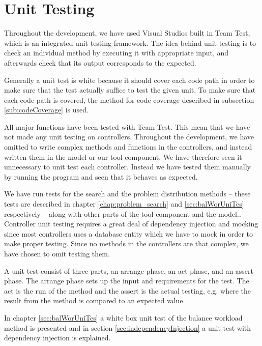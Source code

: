 \section{Unit Testing}
\label{chap:testing}
Throughout the development, we have used Visual Studios built in Team Test, which is an integrated unit-testing framework. \cite{teamtest} 
The idea behind unit testing is to check an individual method by executing it with appropriate input, and afterwards check that its output corresponds to the expected.

Generally a unit test is white because it should cover each code path in order to make sure that the test actually suffice to test the given unit. \cite[p.~39]{williams06}
To make sure that each code path is covered, the method for code coverage described in subsection \ref{sub:codeCoverage} is used.

All major functions have been tested with Team Test. This mean that we have not made any unit testing on controllers. 
Throughout the development, we have omitted to write complex methods and functions in the controllers, and instead written them in the model or our tool component. We have therefore seen it unnecessary to unit test each controller. Instead we have tested them manually by running the program and seen that it behaves as expected. 

We have run tests for the search and the problem distribution methods -- these tests are described in chapter \ref{chap:problem_search} and \ref{sec:balWorUniTes} respectively -- along with other parts of the tool component and the model.. 
Controller unit testing requires a great deal of dependency injection and mocking since most controllers uses a database entity which we have to mock in order to make proper testing.
Since no methods in the controllers are that complex, we have chosen to omit testing them.

A unit test consist of three parts, an arrange phase, an act phase, and an assert phase. 
The arrange phase sets up the input and requirements for the test. 
The act is the run of the method and the assert is the actual testing, e.g. where the result from the method is compared to an expected value.

In chapter \ref{sec:balWorUniTes} a white box unit test of the balance workload method is presented and in section \ref{sec:independencyInjection} a unit test with dependency injection is explained. 